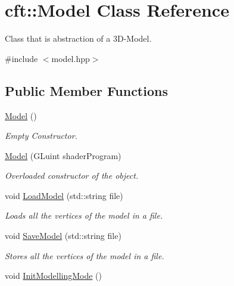 \hypertarget{classcft_1_1Model}{}\section{cft\+:\+:Model Class Reference}
\label{classcft_1_1Model}


Class that is abstraction of a 3\+D-\/\+Model.  




{\ttfamily \#include $<$model.\+hpp$>$}

\subsection*{Public Member Functions}
\begin{DoxyCompactItemize}
\item 
\hyperlink{classcft_1_1Model_a3c0c1f66829e59fcab5786aac5086a4a}{Model} ()\hypertarget{classcft_1_1Model_a3c0c1f66829e59fcab5786aac5086a4a}{}\label{classcft_1_1Model_a3c0c1f66829e59fcab5786aac5086a4a}

\begin{DoxyCompactList}\small\item\em Empty Constructor. \end{DoxyCompactList}\item 
\hyperlink{classcft_1_1Model_a1f3e508bf9546bc63970d2f9386093eb}{Model} (G\+Luint shader\+Program)
\begin{DoxyCompactList}\small\item\em Overloaded constructor of the object. \end{DoxyCompactList}\item 
void \hyperlink{classcft_1_1Model_a1f200fd7be2eee7ef2c7932d9fa62fc9}{Load\+Model} (std\+::string file)
\begin{DoxyCompactList}\small\item\em Loads all the vertices of the model in a file. \end{DoxyCompactList}\item 
void \hyperlink{classcft_1_1Model_ac1c81c55d6a29bfedaa156a65334b525}{Save\+Model} (std\+::string file)
\begin{DoxyCompactList}\small\item\em Stores all the vertices of the model in a file. \end{DoxyCompactList}\item 
void \hyperlink{classcft_1_1Model_a460583d0dbaffc9f25ee538b0110a457}{Init\+Modelling\+Mode} ()\hypertarget{classcft_1_1Model_a460583d0dbaffc9f25ee538b0110a457}{}\label{classcft_1_1Model_a460583d0dbaffc9f25ee538b0110a457}


\end{DoxyCompactItemize}
